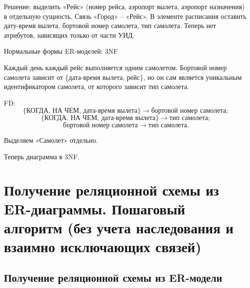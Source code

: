 \documentclass[a4paper,12pt]{article}
\begin{document}
Решение: выделить «Рейс» (номер рейса, аэропорт вылета, аэропорт назначения) в отдельную сущность.
Связь «Город» – «Рейс».  
В элементе расписания оставить дату-время вылета, бортовой номер самолета, тип самолета.
Теперь нет атрибутов, зависящих только от части УИД.

Нормальные формы ER-моделей: 3NF

Каждый день каждый рейс выполняется одним самолетом.
Бортовой номер самолета зависит от \{дата-время вылета, рейс\}, но он сам является уникальным идентификатором самолета, от которого зависит тип самолета.

FD:
\[
\{\text{КОГДА, НА ЧЕМ, дата}\text{-}\text{время вылета}\} \rightarrow \text{бортовой номер самолета};
\]
\[
\{\text{КОГДА, НА ЧЕМ, дата}\text{-}\text{время вылета}\} \rightarrow \text{тип самолета};
\]
\[
\text{бортовой номер самолета} \rightarrow \text{тип самолета}.
\]

Выделяем «Самолет» отдельно.

Теперь диаграмма в 3NF.

\section{Получение реляционной схемы из ER-диаграммы. Пошаговый алгоритм (без учета наследования и взаимно исключающих связей)}

\subsection{Получение реляционной схемы из ER-модели}
\end{document}
